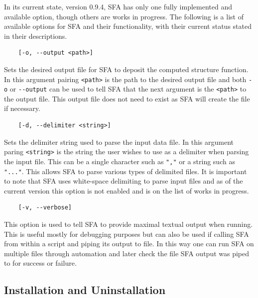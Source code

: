 \documentclass[12pt, oneside]{smuthesis}
\begin{document}
In its current state, version 0.9.4, SFA has only one fully implemented and available option, though others are works in progress. The following is a list of available options for SFA and their functionality, with their current status stated in their descriptions.
\begin{center}
	\begin{BVerbatim}
	[-o, --output <path>]
	\end{BVerbatim}
\end{center}
Sets the desired output file for SFA to deposit the computed structure function. In this argument pairing \verb|<path>| is the path to the desired output file and both \verb|-o| or \verb|--output| can be used to tell SFA that the next argument is the \verb|<path>| to the output file. This output file does not need to exist as SFA will create the file if necessary.
\begin{center}
	\begin{BVerbatim}
	[-d, --delimiter <string>]
	\end{BVerbatim}
\end{center}
Sets the delimiter string used to parse the input data file. In this argument paring \verb|<string>| is the string the user wishes to use as a delimiter when parsing the input file. This can be a single character such as \verb|","| or a string such as \verb|"..."|. This allows SFA to parse various types of delimited files. It is important to note that SFA uses white-space delimiting to parse input files and as of the current version this option is not enabled and is on the list of works in progress.
\begin{center}
	\begin{BVerbatim}
	[-v, --verbose]
	\end{BVerbatim}
\end{center}
This option is used to tell SFA to provide maximal textual output when running. This is useful mostly for debugging purposes but can also be used if calling SFA from within a script and piping its output to file. In this way one can run SFA on multiple files through automation and later check the file SFA output was piped to for success or failure.

\subsection{\sc Installation and Uninstallation}
\end{document}
